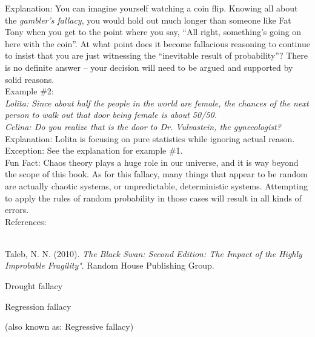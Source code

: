 \documentclass[a4paper,12pt,single,pdftex]{scrartcl}
\begin{document}
    
      Explanation: You can imagine yourself watching a coin flip.  Knowing all about the {\it gambler’s fallacy}, you would hold out much longer than someone like Fat Tony when you get to the point where you say, “All right, something’s going on here with the coin”.  At what point does it become fallacious reasoning to continue to insist that you are just witnessing the “inevitable result of probability”?  There is no definite answer -- your decision will need to be argued and supported by solid reasons.
    \\

    
      Example \#2:
    \\

    
      {\em Lolita: Since about half the people in the world are female, the chances of the next person to walk out that door being female is about 50/50.}
    \\

    
      {\em Celina: Do you realize that is the door to Dr. Vulvastein, the gynecologist?}
    \\

    
      Explanation: Lolita is focusing on pure statistics while ignoring actual reason.
    \\

    
      Exception: See the explanation for example \#1.
    \\

    
      Fun Fact:  Chaos theory plays a huge role in our universe, and it is way beyond the scope of this book.  As for this fallacy, many things that appear to be random are actually chaotic systems, or unpredictable, deterministic systems.  Attempting to apply the rules of random probability in those cases will result in all kinds of errors.
    \\

    References:

    
      
        
      \\

      
        
          Taleb, N. N. (2010). {\it The Black Swan: Second Edition: The Impact of the Highly Improbable Fragility"}. Random House Publishing Group.
        
      
    
  

Drought fallacy

Regression fallacy
    
      (also known as: Regressive fallacy)
    \\
\end{document}

